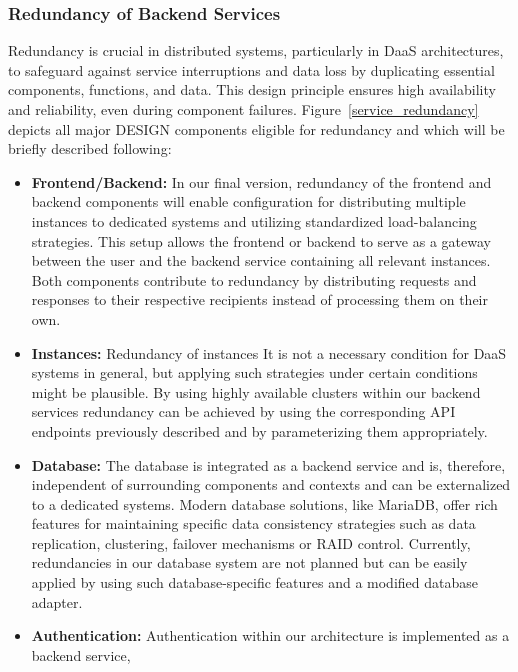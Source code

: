 \documentclass[runningheads]{llncs}
\begin{document}
\subsubsection{Redundancy of Backend Services}

Redundancy is crucial in distributed systems,
particularly in DaaS architectures,
to safeguard against service interruptions and data loss
by duplicating essential components, functions, and data.
This design principle ensures high availability and reliability,
even during component failures.
Figure~\ref{service_redundancy} depicts all major DESIGN components eligible for redundancy
and which will be briefly described following:
\begin{itemize}
	\item \textbf{Frontend/Backend:}
	      In our final version,
	      redundancy of the frontend and backend components
	      will enable configuration for distributing multiple instances
	      to dedicated systems and utilizing standardized load-balancing strategies.
	      This setup allows the frontend or backend
	      to serve as a gateway between the user and the backend service
	      containing all relevant instances.
	      Both components contribute to redundancy
	      by distributing requests and responses to their respective recipients
	      instead of processing them on their own.
	\item \textbf{Instances:} Redundancy of instances
	      It is not a necessary condition for DaaS systems in general,
	      but applying such strategies under certain conditions might be plausible.
	      By using highly available clusters within our backend services
	      redundancy can be achieved by using the corresponding API endpoints
	      previously described and by parameterizing them appropriately.
	\item \textbf{Database:}
	      The database is integrated as a backend service
	      and is, therefore, independent of surrounding components and contexts
	      and can be externalized to a dedicated systems.
	      Modern database solutions, like MariaDB,
	      offer rich features for maintaining specific data consistency strategies
	      such as data replication, clustering, failover mechanisms or RAID control.
	      Currently, redundancies in our database system are not planned
	      but can be easily applied by using such database-specific features
	      and a modified database adapter.
	\item \textbf{Authentication: }
	      Authentication within our architecture is implemented as a backend service,

\end{itemize}
\end{document}
